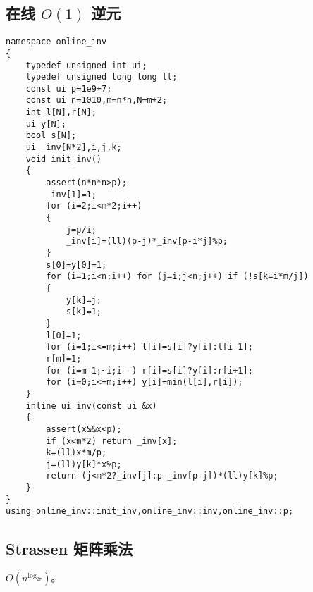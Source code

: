 \documentclass{ctexart}
\begin{document}
\subsection{在线 $O(1)$ 逆元}

\begin{lstlisting}
namespace online_inv
{
	typedef unsigned int ui;
	typedef unsigned long long ll;
	const ui p=1e9+7;
	const ui n=1010,m=n*n,N=m+2;
	int l[N],r[N];
	ui y[N];
	bool s[N];
	ui _inv[N*2],i,j,k;
	void init_inv()
	{
		assert(n*n*n>p);
		_inv[1]=1;
		for (i=2;i<m*2;i++)
		{
			j=p/i;
			_inv[i]=(ll)(p-j)*_inv[p-i*j]%p;
		}
		s[0]=y[0]=1;
		for (i=1;i<n;i++) for (j=i;j<n;j++) if (!s[k=i*m/j])
		{
			y[k]=j;
			s[k]=1;
		}
		l[0]=1;
		for (i=1;i<=m;i++) l[i]=s[i]?y[i]:l[i-1];
		r[m]=1;
		for (i=m-1;~i;i--) r[i]=s[i]?y[i]:r[i+1];
		for (i=0;i<=m;i++) y[i]=min(l[i],r[i]);
	}
	inline ui inv(const ui &x)
	{
		assert(x&&x<p);
		if (x<m*2) return _inv[x];
		k=(ll)x*m/p;
		j=(ll)y[k]*x%p;
		return (j<m*2?_inv[j]:p-_inv[p-j])*(ll)y[k]%p;
	}
}
using online_inv::init_inv,online_inv::inv,online_inv::p;
\end{lstlisting}

\subsection{Strassen 矩阵乘法}

$O(n^{\log_27})$。
\end{document}
